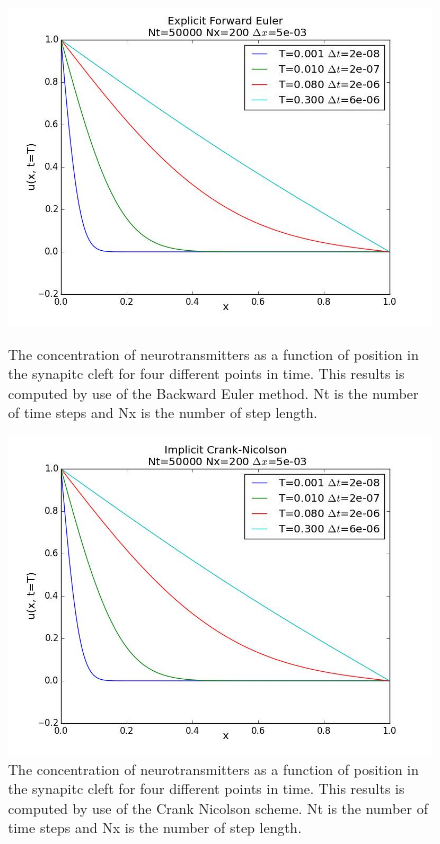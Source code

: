 \documentclass[12pt]{article}
\begin{document}
\begin{flushleft}
\begin{figure}[!h]
\begin{center}
\begin{minipage}[b]{0.45\linewidth}
	\includegraphics[scale=0.29]{EF_Nt5000_Nx200}
  \caption{\label{fig:backward_Euler_u}The concentration of neurotransmitters as a function of position in the synapitc cleft for four different points in time. This results is computed by use of the Backward Euler method. Nt is the number of time steps and Nx is the number of step length.}
\end{minipage}
\quad
\begin{minipage}[b]{0.45\linewidth}
	\includegraphics[scale=0.29]{CN_Nt5000_Nx200}
  \caption{\label{fig:Crank_Nicolson_u}The concentration of neurotransmitters as a function of position in the synapitc cleft for four different points in time. This results is computed by use of the Crank Nicolson scheme. Nt is the number of time steps and Nx is the number of step length.}
\end{minipage}
\end{center}
\end{figure}





\end{flushleft}
\end{document}
